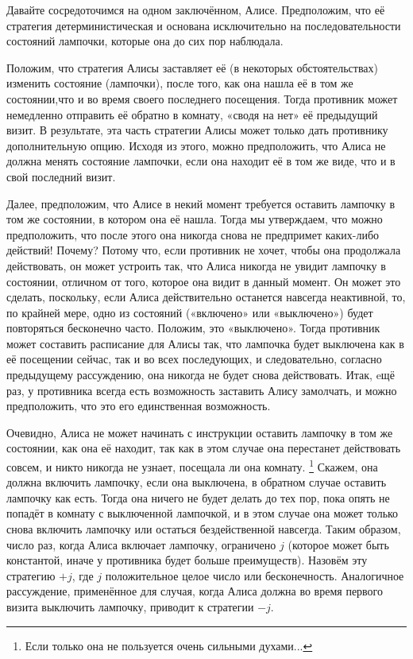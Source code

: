 Давайте сосредоточимся на одном заключённом, Алисе.
Предположим, что её стратегия детерминистическая и основана исключительно на последовательности состояний лампочки, которые она до сих пор наблюдала.

Положим, что стратегия Алисы заставляет её (в некоторых обстоятельствах) изменить состояние (лампочки), после того, как она нашла её в том же состоянии,что и во время своего последнего посещения.
Тогда противник может немедленно отправить её обратно в комнату, «сводя на нет» её предыдущий визит.
В результате, эта часть стратегии Алисы может только дать противнику дополнительную опцию.
Исходя из этого, можно предположить, что Алиса не должна менять состояние лампочки, если она находит её в том же виде, что и в свой последний визит.

Далее, предположим, что Алисе в некий момент требуется оставить лампочку в том же состоянии, в котором она её нашла.
Тогда мы утверждаем, что можно предположить, что после этого она никогда снова не предпримет каких-либо действий! Почему? Потому что, если противник не хочет, чтобы она продолжала действовать, он может устроить так, что Алиса никогда не увидит лампочку в состоянии, отличном от того, которое она видит в данный момент.
Он может это сделать, поскольку, если Алиса действительно останется навсегда неактивной, то, по крайней мере, одно из состояний («включено» или «выключено») будет повторяться бесконечно часто.
Положим, это «выключено».
Тогда противник может составить расписание для Алисы так, что лампочка будет выключена как в её посещении сейчас, так и во всех последующих, и следовательно, согласно предыдущему рассуждению, она никогда не будет снова действовать.
Итак, eщё раз, у противника всегда есть возможность заставить Алису замолчать, и можно предположить, что это его единственная возможность.

Очевидно, Алиса не может начинать с инструкции оставить лампочку в том же состоянии, как она её находит, так как в этом случае она перестанет действовать совсем, и никто никогда не узнает, посещала ли она комнату.%
\footnote{Если только она не пользуется очень сильными духами...}
Скажем, она должна включить лампочку, если она выключена, в обратном случае оставить лампочку как есть.
Тогда она ничего не будет делать до тех пор, пока опять не попадёт в комнату с выключенной лампочкой, и в этом случае она может только снова включить лампочку или остаться бездейственной навсегда.
Таким образом, число раз, когда Алиса включает лампочку, ограничено $j$ (которое может быть константой, иначе у противника будет больше преимуществ).
Назовём эту стратегию $+j$, где $j$ положительное целое число или бесконечность.
Аналогичное рассуждение, применённое для случая, когда Алиса должна во время первого визита выключить лампочку, приводит к стратегии $-j$.

